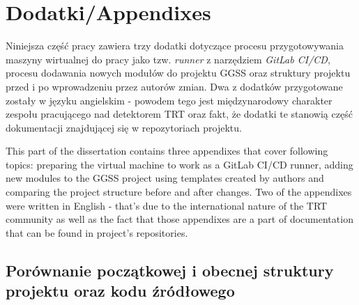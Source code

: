 \appendix
\chapter{Dodatki/Appendixes}
\label{cha:app}
Niniejsza część pracy zawiera trzy dodatki dotyczące procesu przygotowywania maszyny wirtualnej do pracy jako tzw. \textit{runner} z narzędziem \textit{GitLab CI/CD}, procesu dodawania nowych modułów do projektu GGSS oraz struktury projektu przed i po wprowadzeniu przez autorów zmian. Dwa z dodatków przygotowane zostały w języku angielskim - powodem tego jest międzynarodowy charakter zespołu pracującego nad detektorem TRT oraz fakt, że dodatki te stanowią część dokumentacji znajdującej się w repozytoriach projektu.

This part of the dissertation contains three appendixes that cover following topics: preparing the virtual machine to work as a GitLab CI/CD runner, adding new modules to the GGSS project using templates created by authors and comparing the project structure before and after changes. Two of the appendixes were written in English - that's due to the international nature of the TRT community as well as the fact that those appendixes are a part of documentation that can be found in project's repositories. 

\section{Porównanie początkowej i obecnej struktury projektu oraz kodu źródłowego}

\newpage

\twocolumn


\def\redcolor{\color{red}}
\def\blackcolor{\color{black}}
\def\greencolor{\color{green}}
\def\purplecolor{\color{plum(traditional)}}
\def\bluecolor{\color{blue}}
\def\ambercolor{\color{amber(sae/ece)}}
\def\darkgreencolor{\color{cadmiumgreen}}
\def\capricolor{\color{capri}}
\def\magentacolor{\color{magenta}}
\def\sinopiacolor{\color{sinopia}}


